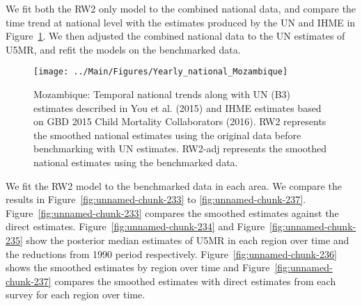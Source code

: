 \documentclass[12pt]{article}\usepackage[]{graphicx}\usepackage[]{color}
\newenvironment{knitrout}{}{} %
\begin{document}
We fit both the RW2 only model to the combined national data, and compare the time trend at national level with the estimates produced by the UN and IHME in Figure~\ref{fig:unnamed-chunk-232}. We then adjusted the combined national data to the UN estimates of U5MR, and refit the models on the benchmarked data. 

\begin{knitrout}
\color{fgcolor}\begin{figure}[bht]

{\centering \texttt{[image: ../Main/Figures/Yearly\_national\_Mozambique]} 

}

\caption[Mozambique]{Mozambique: Temporal national trends along with UN (B3) estimates described in You et al. (2015) and IHME estimates based on GBD 2015 Child Mortality Collaborators (2016). RW2 represents the smoothed national estimates using the original data before benchmarking with UN estimates. RW2-adj represents the smoothed national estimates using the benchmarked data.}\label{fig:unnamed-chunk-232}
\end{figure}


\end{knitrout}
 

We fit the RW2 model to the benchmarked data in each area. 
We compare the results in Figure~\ref{fig:unnamed-chunk-233} to \ref{fig:unnamed-chunk-237}.
Figure~\ref{fig:unnamed-chunk-233} compares the smoothed estimates against the direct estimates. Figure~\ref{fig:unnamed-chunk-234} and Figure~\ref{fig:unnamed-chunk-235} show the posterior median estimates of U5MR in each region over time and the reductions from 1990 period respectively.
Figure~\ref{fig:unnamed-chunk-236} shows the smoothed estimates by region over time and Figure~\ref{fig:unnamed-chunk-237} compares the smoothed estimates with direct estimates from each survey for each region over time.




\end{document}
